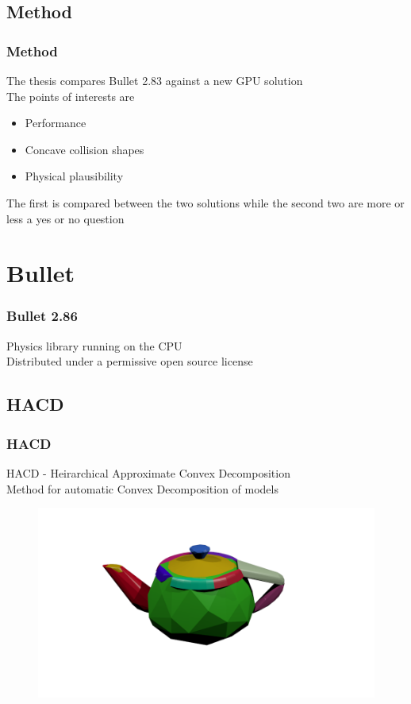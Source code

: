 \documentclass{beamer}
\begin{document}
	\subsection{Method}
	\begin{frame}
		\frametitle{Method}
		The thesis compares Bullet 2.83 against a new GPU solution \\
		The points of interests are
		\begin{itemize}
			\item Performance
			\item Concave collision shapes
			\item Physical plausibility
		\end{itemize}
		The first is compared between the two solutions while the second two are more or less a yes or no question
	\end{frame}

	\section{Bullet}
	\begin{frame}
		\frametitle{Bullet 2.86}
		Physics library running on the CPU\\
		Distributed under a permissive open source license
	\end{frame}
	\subsection{HACD}
	\begin{frame}
		\frametitle{HACD}
		HACD - Heirarchical Approximate Convex Decomposition \\
		Method for automatic Convex Decomposition of models
		\begin{figure}
			\includegraphics[width=0.5\linewidth]{fig/hacdTeapot.png}
		\end{figure}
	\end{frame}
\end{document}
